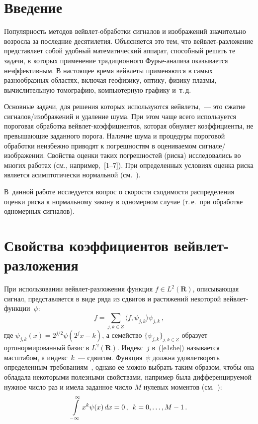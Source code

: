       \begin{multicols}{2}

      \label{st\stat}


\section{Введение}

Популярность методов вейвлет-обработки сигналов и изображений значительно возросла за последние десятилетия. 
Объясняется это тем, что вейв\-лет-разложение представляет собой удобный математический аппарат, способный решать 
те задачи, в которых применение традиционного Фурье-ана\-ли\-за оказывается неэффективным. В настоящее время вейвлеты 
применяются в самых разнообразных областях, включая геофизику, оптику, физику плазмы, вычислительную томографию, 
компьютерную графику и~т.\,д. 

Основные задачи, для решения которых используются вейвлеты,~--- 
это сжатие сигналов/изображений и удаление шума. При этом чаще всего используется пороговая 
обработка вейвлет-коэффициентов, которая обнуляет коэффициенты, не превышающие заданного порога. 
Наличие шума и процедуры пороговой обработки неизбежно приводят к погрешностям в оце\-ни\-ва\-емом 
сигнале/изображении. Свойства оценки таких погрешностей (риска) исследовались во многих работах 
(см., например,~[1--7]). При определенных условиях оценка риска является асимптотически нормальной (см.~\cite{7she}). 

В~данной работе исследуется вопрос о скорости сходимости распределения оценки риска к нормальному закону в одномерном 
случае (т.\,е.\ при обработке одномерных сигналов).

\section{Свойства коэффициентов вейвлет-разложения}

При использовании вейвлет-разложения функция $f\in L^2(\mathbf{R})$, описывающая сигнал, 
представляется в виде ряда из сдвигов и растяжений некоторой вейвлет-функ\-ции~$\psi$:
\begin{equation}
f=\sum_{j,k\in Z}\langle f,\psi_{j,k}\rangle\psi_{j,k}\,,
\label{e1she}
\end{equation}
где $\psi_{j,k}(x)=2^{j/2}\psi(2^jx-k)$, а семейство $\{\psi_{j,k}\}_{j,k\in Z}$ образует ортонормированный 
базис в $L^2(\mathbf{R})$. Индекс~$j$ в~(\ref{e1she}) называется масштабом, а индекс~$k$~--- сдвигом. 
Функция~$\psi$ должна удовлетворять определенным требованиям~\cite{8she}, 
однако ее можно выбрать таким образом, чтобы она обладала некоторыми полезными свойствами, 
например была дифференцируемой нужное число раз и имела заданное число $M$ нулевых моментов (см.~\cite{8she}):
$$
\int\limits_{-\infty}^{\infty}x^k\psi(x)\,dx=0\,,\enskip k=0,\ldots,M-1\,.
$$


\end{multicols}
